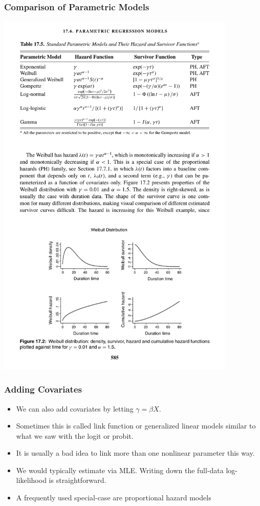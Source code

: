 \documentclass[aspectratio=169]{beamer}
\begin{document}
\begin{frame}
\frametitle{Comparison of Parametric Models}
\begin{center}
\includegraphics[width=4.5in]{./resources/figure17-5.pdf}
\end{center}
\end{frame}

\begin{frame}
\frametitle{Adding Covariates }
\begin{itemize}
\item We can also add covariates by letting $\gamma = \beta X$.
\item Sometimes this is called \alert{link function} or \alert{generalized linear models} similar to what we saw with the logit or probit.
\item It is usually a bad idea to link more than one nonlinear parameter this way.
\item We would typically estimate via MLE. Writing down the full-data log-likelihood is straightforward.
\item A frequently used special-case are \alert{proportional hazard models}
\end{itemize}
\end{frame}
\end{document}
